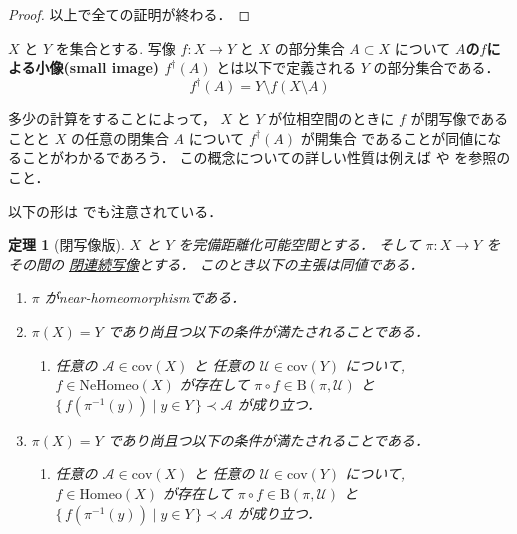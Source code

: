 \documentclass[leqno, a4paper, 12pt]{jsarticle}
\numberwithin{equation}{section}
\newtheorem{thm}{定理}
\newcommand{\yocov}[1]{\mathrm{cov}(#1)}
\newcommand{\yocovfont}[1]{\mathscr{#1}}
\newcommand{\yofine}{\prec}
\newcommand{\yonbset}[2]{\mathrm{B}(#1, #2)}
\newcommand{\yomapnhset}[1]{\mathrm{NeHomeo}(#1)}
\newcommand{\yomaphset}[1]{\mathrm{Homeo}(#1)}
\newcommand{\yosmim}[1]{#1^{\dagger}}
\begin{document}
\begin{proof}
以上で全ての証明が終わる．
\end{proof}


$X$
と
$Y$
を集合とする.
写像
$f\colon X\to Y$
と
$X$
の部分集合
$A\subset X$
について
\textbf{$A$の$f$による小像(small image)
$\yosmim{f}(A)$}
とは以下で定義される
$Y$
の部分集合である．
\[
\yosmim{f}(A)=Y\setminus f(X\setminus A)
\]

多少の計算をすることによって，
$X$
と
$Y$
が位相空間のときに
$f$
が閉写像であることと
$X$
の任意の閉集合
$A$
について
$\yosmim{f}(A)$
が開集合
であることが同値になることがわかるであろう．
この概念についての詳しい性質は例えば
\cite{alg-d1}
や
\cite{dempa1}
を参照のこと．


以下の形は
\cite{zbMATH03734780}
でも注意されている．



\begin{thm}[閉写像版]\label{thm:main2}
$X$
と
$Y$
を完備距離化可能空間とする．
そして
$\pi \colon X\to Y$
をその間の
\underline{閉連続写像}とする．
このとき以下の主張は同値である．
\begin{enumerate}[label=\textup{(\arabic*)}]
\item\label{item:thmcl:1}
$\pi$
がnear-homeomorphismである．


\item\label{item:thmcl:2}
$\pi(X)=Y$
であり尚且つ以下の条件が満たされることである．
\begin{enumerate}[label=\textup{(Bing-C)}, leftmargin=*]
\item\label{item:bingconditioncl}
任意の
$\yocovfont{A}\in \yocov{X}$
と
任意の
$\yocovfont{U}\in \yocov{Y}$
について, 
$f\in \yomapnhset{X}$
が存在して
$\pi\circ f\in \yonbset{\pi}{\yocovfont{U}}$
と
$\{\, f(\pi^{-1}(y))\mid y\in Y\, \}\yofine \yocovfont{A}$
が成り立つ．
\end{enumerate}


\item\label{item:thmcl:3}
$\pi(X)=Y$
であり尚且つ以下の条件が満たされることである．
\begin{enumerate}[label=\textup{(Bing-$*$C)}, leftmargin=*]
\item\label{item:bingconditionclstar}
任意の
$\yocovfont{A}\in \yocov{X}$
と
任意の
$\yocovfont{U}\in \yocov{Y}$
について, 
$f\in \yomaphset{X}$
が存在して
$\pi\circ f\in \yonbset{\pi}{\yocovfont{U}}$
と
$\{\, f(\pi^{-1}(y))\mid y\in Y\, \}\yofine \yocovfont{A}$
が成り立つ．
\end{enumerate}

\end{enumerate}
\end{thm}
\end{document}
